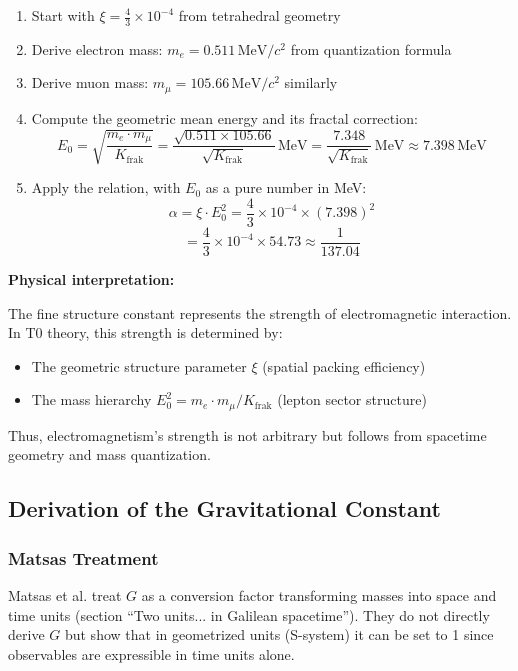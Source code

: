	\begin{enumerate}
		\item Start with $\xi = \frac{4}{3} \times 10^{-4}$ from tetrahedral geometry
		
		\item Derive electron mass: $m_e = 0.511\,\text{MeV}/c^2$ from quantization formula
		
		\item Derive muon mass: $m_\mu = 105.66\,\text{MeV}/c^2$ similarly
		
		\item Compute the geometric mean energy and its fractal correction:
		\[
		E_0 = \sqrt{\frac{m_e \cdot m_\mu}{K_{\text{frak}}}} = \frac{\sqrt{0.511 \times 105.66}}{\sqrt{K_{\text{frak}}}}\,\text{MeV} = \frac{7.348}{\sqrt{K_{\text{frak}}}}\,\text{MeV} \approx 7.398\,\text{MeV}
		\]
		
		\item Apply the relation, with $E_0$ as a pure number in MeV:
		\[
		\alpha = \xi \cdot E_0^2 = \frac{4}{3} \times 10^{-4} \times (7.398)^2
		\]
		\[
		= \frac{4}{3} \times 10^{-4} \times 54.73 \approx \frac{1}{137.04}
		\]
	\end{enumerate}
	
	\textbf{Physical interpretation:}
	
	The fine structure constant represents the strength of electromagnetic interaction. In T0 theory, this strength is determined by:
	\begin{itemize}
		\item The geometric structure parameter $\xi$ (spatial packing efficiency)
		\item The mass hierarchy $E_0^2 = m_e \cdot m_\mu/K_{\text{frak}}$ (lepton sector structure)
	\end{itemize}
	
	Thus, electromagnetism's strength is not arbitrary but follows from spacetime geometry and mass quantization.
	
	\subsection{Derivation of the Gravitational Constant}\label{sec:G_derivation}
	
	\subsubsection{Matsas Treatment}
	
	Matsas et al. treat $G$ as a conversion factor transforming masses into space and time units (section ``Two units... in Galilean spacetime''). They do not directly derive $G$ but show that in geometrized units (S-system) it can be set to 1 since observables are expressible in time units alone.
	
